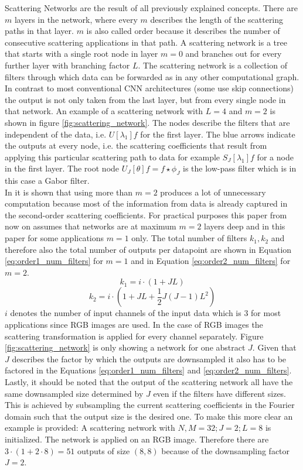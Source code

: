 Scattering Networks are the result of all previously explained concepts. There are $m$ layers in the network, where every $m$ describes the length of the scattering paths in that layer. $m$ is also called order because it describes the number of consecutive scattering applications in that path. A scattering network is a tree that starts with a single root node in layer $m=0$ and branches out for every further layer with branching factor $L$. The scattering network is a collection of filters through which data can be forwarded as in any other computational graph. In contrast to most conventional CNN architectures (some use skip connections) the output is not only taken from the last layer, but from every single node in that network. An example of a scattering network with $L=4$ and $m=2$ is shown in figure \ref{fig:scattering_network}. The nodes describe the filters that are independent of the data, i.e. $U[\lambda_1]f$ for the first layer. The blue arrows indicate the outputs at every node, i.e. the scattering coefficients that result from applying this particular scattering path to data for example $S_J[\lambda_1]f$ for a node in the first layer. The root node $U_J[\theta]f = f \star \phi_J$ is the low-pass filter which is in this case a Gabor filter. \\
In \cite{scatteringTransform2012} it is shown that using more than $m=2$ produces a lot of unnecessary computation because most of the information from data is already captured in the second-order scattering coefficients. For practical purposes this paper from now on assumes that networks are at maximum $m=2$ layers deep and in this paper for some applications $m=1$ only. 
The total number of filters $k_1,k_2$ and therefore also the total number of outputs per datapoint are shown in Equation \ref{eq:order1_num_filters} for $m=1$ and in Equation \ref{eq:order2_num_filters} for $m=2$.
\begin{equation}
k_1 = i \cdot (1 + JL) 
\label{eq:order1_num_filters}
\end{equation} 
\begin{equation}
k_2 = i \cdot (1 + JL + \frac{1}{2}J(J-1)L^2)
\label{eq:order2_num_filters}
\end{equation}
$i$ denotes the number of input channels of the input data which is 3 for most applications since RGB images are used. In the case of RGB images the scattering transformation is applied for every channel separately. Figure \ref{fig:scattering_network} is only showing a network for one abstract $J$. Given that $J$ describes the factor by which the outputs are downsampled it also has to be factored in the Equations \ref{eq:order1_num_filters} and \ref{eq:order2_num_filters}. Lastly, it should be noted that the output of the scattering network all have the same downsampled size determined by $J$ even if the filters have different sizes. This is achieved by subsampling the current scattering coefficients in the Fourier domain such that the output size is the desired one. To make this more clear an example is provided: A scattering network with $N,M = 32; J=2; L=8$ is initialized. The network is applied on an RGB image. Therefore there are $3 \cdot (1+2 \cdot 8) = 51$ outputs of size $(8,8)$ because of the downsampling factor $J=2$. 
